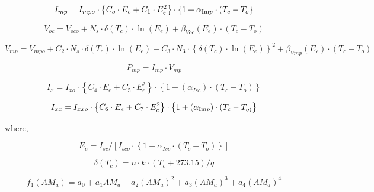\begin{equation}
{I_{mp}} = {I_{mpo}} \cdot \left\{ {{C_o} \cdot {E_e} + {C_1} \cdot E_e^2} \right\} \cdot \left\{ {1 + {\alpha_{{\mathop{\rm Im}\nolimits} p}} \cdot ({T_c} - {T_o}} \right\}
\end{equation}

\begin{equation}
{V_{oc}} = {V_{oco}} + {N_s} \cdot \delta ({T_c}) \cdot \ln ({E_e}) + {\beta_{Voc}}({E_e}) \cdot \left( {{T_c} - {T_o}} \right)
\end{equation}

\begin{equation}
{V_{mp}} = {V_{mpo}} + {C_2} \cdot {N_s} \cdot \delta \left( {T_c^{}} \right) \cdot \ln \left( {{E_e}} \right) + {C_3} \cdot {N_3} \cdot {\left\{ {\delta \left( {T_c^{}} \right) \cdot \ln \left( {{E_e}} \right)} \right\}^2} + {\beta_{Vmp}}({E_e}) \cdot ({T_c} - {T_o})
\end{equation}

\begin{equation}
{P_{mp}} = {I_{mp}} \cdot {V_{mp}}
\end{equation}

\begin{equation}
{I_x} = {I_{xo}} \cdot \left\{ {{C_4} \cdot {E_e} + {C_5} \cdot E_e^2} \right\} \cdot \left\{ {1 + ({\alpha_{Isc}}) \cdot ({T_c} - {T_o})} \right\}
\end{equation}

\begin{equation}
{I_{xx}} = {I_{xxo}} \cdot \left\{ {{C_6} \cdot {E_e} + {C_7} \cdot E_e^2} \right\} \cdot \left\{ {1 + ({\alpha_{{\mathop{\rm Im}\nolimits} p}}) \cdot ({T_c} - {T_{o)}}} \right\}
\end{equation}

where,

\begin{equation}
{E_e} = {I_{sc}}/\left[ {{I_{sco}} \cdot \left\{ {1 + {\alpha_{Isc}} \cdot ({T_c} - {T_o})} \right\}} \right]
\end{equation}

\begin{equation}
\delta ({T_c}) = n \cdot k \cdot ({T_c} + 273.15)/q
\end{equation}

\begin{equation}
{f_1}\left( {A{M_a}} \right) = {a_0} + {a_1}A{M_a} + {a_2}{\left( {A{M_a}} \right)^2} + {a_3}{\left( {A{M_a}} \right)^3} + {a_4}{\left( {A{M_a}} \right)^4}
\end{equation}

